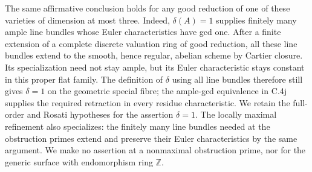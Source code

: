 The same affirmative conclusion holds for any good
reduction of one of these varieties of dimension at most
three. Indeed, \(\delta(A)=1\) supplies finitely many
ample line bundles whose Euler characteristics have gcd
one. After a finite extension of a complete discrete
valuation ring of good reduction, all these line bundles
extend to the smooth, hence regular, abelian scheme by Cartier
closure. Its specialization need not stay ample, but
its Euler characteristic stays constant in this proper
flat family. The definition of \(\delta\) using all line
bundles therefore still gives \(\delta=1\) on the
geometric special fibre; the ample-gcd equivalence in
C.4j supplies the required retraction in every residue
characteristic. We retain the full-order and Rosati
hypotheses for the assertion \(\delta=1\).
The locally maximal refinement also specializes:
the finitely many line bundles needed at the
obstruction primes extend and preserve their Euler
characteristics by the same argument. We make no
assertion at a nonmaximal obstruction prime, nor
for the generic surface with endomorphism ring
\(\mathbb Z\).

